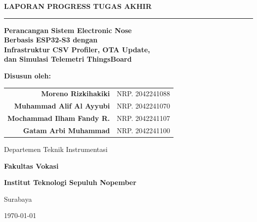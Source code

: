 \documentclass[12pt,a4paper]{report}
\begin{document}
\begin{titlepage}
  \thispagestyle{empty}
  \centering
  \vspace*{0.5cm}
  {\Large\bfseries\color{darkblue} LAPORAN PROGRESS TUGAS AKHIR\par}
  \vspace{0.3cm}
  {\color{darkblue}\rule{\linewidth}{1.5pt}}\par
  \vspace{0.8cm}
  {\LARGE\bfseries\color{darkblue}\linespread{1.25}\selectfont
    Perancangan Sistem Electronic Nose\\
    Berbasis ESP32-S3 dengan\\
    Infrastruktur CSV Profiler, OTA Update,\\
    dan Simulasi Telemetri ThingsBoard\par
  }
  \vspace{1.2cm}
  {\large\bfseries Disusun oleh:\par}
  \vspace{0.4cm}
  \begin{tabular}{rl}
    \textbf{Moreno Rizkihakiki}              & NRP. 2042241088 \\
    \textbf{Muhammad Alif Al Ayyubi}         & NRP. 2042241070 \\
    \textbf{Mochammad Ilham Fandy R.}        & NRP. 2042241107 \\
    \textbf{Gatam Arbi Muhammad}             & NRP. 2042241100 \\
  \end{tabular}
  \vfill
  {\large Departemen Teknik Instrumentasi\par}
  \vspace{0.15cm}
  {\large\bfseries Fakultas Vokasi\par}
  \vspace{0.15cm}
  {\large\bfseries Institut Teknologi Sepuluh Nopember\par}
  \vspace{0.15cm}
  {\large Surabaya\par}
  \vspace{0.6cm}
  {\large \today\par}
  \vspace*{0.3cm}
\end{titlepage}

\tableofcontents
\newpage
\listoffigures
\newpage
\listoftables
\newpage
{}
\end{document}
